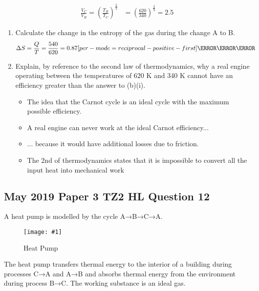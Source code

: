 \documentclass[a4paper,12pt]{article}
\let\oldsi\si
\renewcommand{\si}[1]{\oldsi[per-mode=reciprocal-positive-first]{#1}}
\newcommand{\img}[4]{\begin{center}
  \begin{figure}[H]
    \centering
    \texttt{[image: \#1]}
    \caption{#3}
    \label{fig:#4}
  \end{figure}
\end{center}}
\begin{document}
\begin{enumerate}[label=(\alph*)]
\begin{enumerate}[label=(\roman*)]
\begin{align*}
                  \frac{V_C}{V_B} = \left(\frac{T_B}{T_C}\right)^\frac{2}{3} & = \left(\frac{620}{340}\right)^\frac{2}{3} = 2.5
                \end{align*}
        \end{enumerate}
        \begin{enumerate}[label=(\roman*)]
          \item Calculate the change in the entropy of the gas during the change A to B.
                \begin{align*}
                  \Delta S & = \frac{Q}{T} = \frac{540}{620} = 0.87\si{\joule\per\kelvin}
                \end{align*}
          \item Explain, by reference to the second law of thermodynamics, why a real engine
                operating between the temperatures of 620 K and 340 K cannot have an
                efficiency greater than the answer to (b)(i).
                \begin{itemize}
                  \item The idea that the Carnot cycle is an ideal cycle with the maximum possible efficiency.
                  \item A real engine can never work at the ideal Carnot efficiency...
                  \item ... because it would have additional losses due to friction.
                  \item The 2nd of thermodynamics states that it is impossible to
                        convert all the input heat into mechanical work
                \end{itemize}
        \end{enumerate}

\end{enumerate}


\subsection{May 2019 Paper 3 TZ2 HL Question 12}

A heat pump is modelled by the cycle A→B→C→A.

\img{ex/5.png}{0.5}{Heat Pump}{ex5}

The heat pump transfers thermal energy to the interior of a building during processes
C→A and A→B and absorbs thermal energy from the environment during process B→C.
The working substance is an ideal gas.
\end{document}
